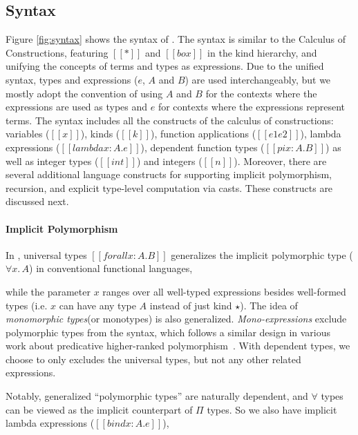 \subsection{Syntax}

Figure \ref{fig:syntax} shows the syntax of \name. The syntax is similar
to the Calculus of Constructions, featuring
$[[*]]$ and $[[box]]$ in the kind hierarchy, and unifying the concepts of terms
and types as expressions. Due to the unified syntax, types and
expressions ($e$, $A$ and $B$) are used
interchangeably, but we mostly adopt the convention of using $A$ and $B$
for the contexts where the expressions are used as types and $e$ for contexts
where the expressions represent terms.
The syntax includes all the constructs of the calculus of constructions:
variables ($[[x]]$), kinds ($[[k]]$), function applications  ($[[e1 e2]]$),
lambda expressions ($[[lambda x : A. e]]$), dependent function types ($[[pi x : A. B]]$)
as well as integer types ($[[int]]$) and integers ($[[n]]$).
Moreover, there are several additional language constructs for
supporting implicit polymorphism, recursion, and explicit type-level computation
via casts. These constructs are discussed next.

\paragraph{Implicit Polymorphism}
In \name, universal types $[[forall x : A. B]]$ generalizes the implicit
polymorphic type ($\forall x.\, A$) in conventional functional languages,


while the parameter $x$ ranges over all well-typed expressions besides well-formed
types (i.e. $x$ can have any type $A$ instead of just kind $\star$). The idea of
\emph{monomorphic types}(or monotypes) is also generalized.
\emph{Mono-expressions} \tau exclude polymorphic types from the syntax,
which follows a similar design in various work about predicative
higher-ranked polymorphism~\cite{odersky1996putting,dunfield2013complete,jones2007practical}.
With dependent types, we choose to only excludes the universal types, but not
any other related expressions.

Notably,
generalized ``polymorphic types'' are naturally dependent, and $\forall$
types can be viewed as the implicit counterpart of $\Pi$ types.
So we also have implicit lambda expressions ($[[bind x : A. e]]$),


